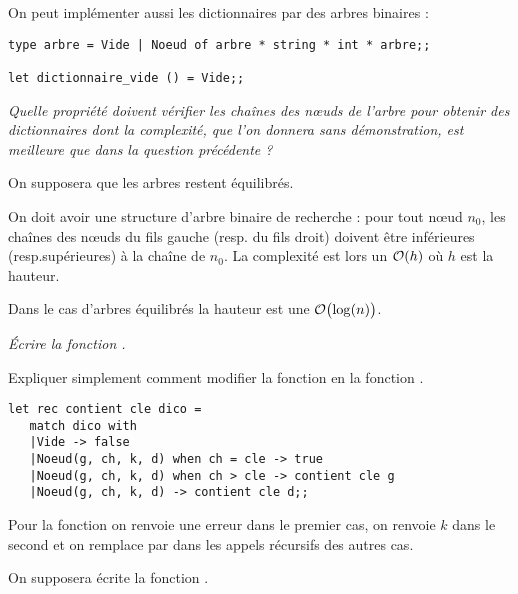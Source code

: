 On peut implémenter aussi les dictionnaires par des arbres binaires :
\begin{lstlisting}
type arbre = Vide | Noeud of arbre * string * int * arbre;;

let dictionnaire_vide () = Vide;;
\end{lstlisting}
\begin{Exercise}\it 
Quelle propriété doivent vérifier les chaînes des nœuds de l'arbre pour obtenir des dictionnaires dont la complexité, que l'on donnera sans démonstration, est meilleure que dans la question précédente ?

On supposera que les arbres restent équilibrés.
\end{Exercise}
\begin{Answer}
On doit avoir une structure d'arbre binaire de recherche : pour tout nœud $n_0$, les chaînes des nœuds du fils gauche (resp. du fils droit) doivent être inférieures (resp.supérieures) à la chaîne de $n_0$.
La complexité est lors un ${\cal O}(h)$ où $h$ est la hauteur.

Dans le cas d'arbres équilibrés la hauteur est une ${\cal O}\bigl(\log(n)\bigr)$.
\end{Answer}
\begin{Exercise}\it 
Écrire la fonction .

Expliquer simplement comment modifier la fonction   en la fonction .
\end{Exercise}
\begin{Answer}
\begin{lstlisting}
let rec contient cle dico =
   match dico with
   |Vide -> false
   |Noeud(g, ch, k, d) when ch = cle -> true
   |Noeud(g, ch, k, d) when ch > cle -> contient cle g
   |Noeud(g, ch, k, d) -> contient cle d;;   
\end{lstlisting}
Pour la fonction  on renvoie une erreur dans le premier cas, on renvoie $k$ dans le second et on remplace  par  dans les appels récursifs des autres cas.
\end{Answer}
On supposera écrite la fonction .

